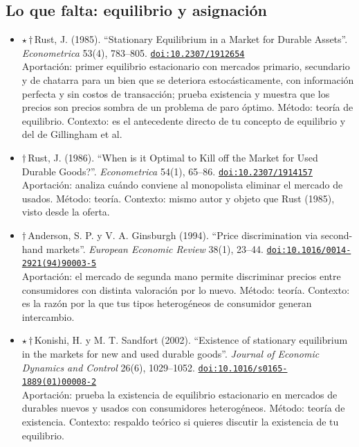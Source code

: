 \documentclass[11pt]{article}
\begin{document}
\subsection*{Lo que falta: equilibrio y asignación}
\begin{itemize}
\item $\star$\,$\dagger$\,Rust, J. (1985). ``Stationary Equilibrium in a Market for Durable Assets''. \textit{Econometrica} 53(4), 783--805. \href{https://doi.org/10.2307/1912654}{\texttt{doi:10.2307/1912654}}\\
Aportación: primer equilibrio estacionario con mercados primario, secundario y de chatarra para un bien que se deteriora estocásticamente, con información perfecta y sin costos de transacción; prueba existencia y muestra que los precios son precios sombra de un problema de paro óptimo. Método: teoría de equilibrio. Contexto: es el antecedente directo de tu concepto de equilibrio y del de Gillingham et al.
\item $\dagger$\,Rust, J. (1986). ``When is it Optimal to Kill off the Market for Used Durable Goods?''. \textit{Econometrica} 54(1), 65--86. \href{https://doi.org/10.2307/1914157}{\texttt{doi:10.2307/1914157}}\\
Aportación: analiza cuándo conviene al monopolista eliminar el mercado de usados. Método: teoría. Contexto: mismo autor y objeto que Rust (1985), visto desde la oferta.
\item $\dagger$\,Anderson, S. P. y V. A. Ginsburgh (1994). ``Price discrimination via second-hand markets''. \textit{European Economic Review} 38(1), 23--44. \href{https://doi.org/10.1016/0014-2921(94)90003-5}{\texttt{doi:10.1016/0014-2921(94)90003-5}}\\
Aportación: el mercado de segunda mano permite discriminar precios entre consumidores con distinta valoración por lo nuevo. Método: teoría. Contexto: es la razón por la que tus tipos heterogéneos de consumidor generan intercambio.
\item $\star$\,$\dagger$\,Konishi, H. y M. T. Sandfort (2002). ``Existence of stationary equilibrium in the markets for new and used durable goods''. \textit{Journal of Economic Dynamics and Control} 26(6), 1029--1052. \href{https://doi.org/10.1016/s0165-1889(01)00008-2}{\texttt{doi:10.1016/s0165-1889(01)00008-2}}\\
Aportación: prueba la existencia de equilibrio estacionario en mercados de durables nuevos y usados con consumidores heterogéneos. Método: teoría de existencia. Contexto: respaldo teórico si quieres discutir la existencia de tu equilibrio.

\end{itemize}
\end{document}
